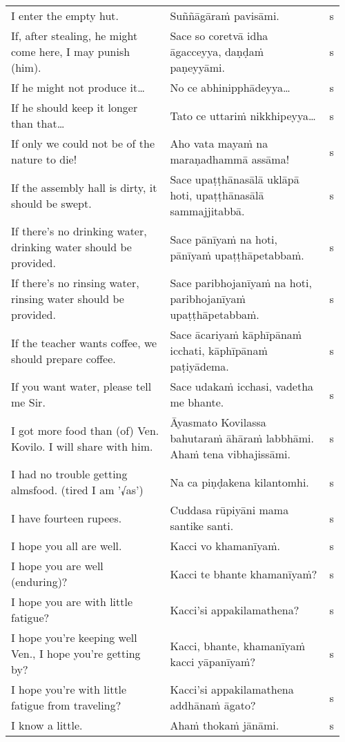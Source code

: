 \documentclass[a5paper]{memoir}
\begin{document}
\begin{longtable}{L{0.48\linewidth} L{0.48\linewidth} H}
I enter the empty hut. & Suññāgāraṁ pavisāmi. & s\\[0pt]
If, after stealing, he might come here, I may punish (him). & Sace so coretvā idha āgacceyya, daṇḍaṁ paṇeyyāmi. & s\\[0pt]
If he might not produce it\ldots{} & No ce abhinipphādeyya\ldots{} & s\\[0pt]
If he should keep it longer than that\ldots{} & Tato ce uttariṁ nikkhipeyya\ldots{} & s\\[0pt]
If only we could not be of the nature to die! & Aho vata mayaṁ na maraṇadhammā assāma! & s\\[0pt]
If the assembly hall is dirty, it should be swept. & Sace upaṭṭhānasālā uklāpā hoti, upaṭṭhānasālā sammajjitabbā. & s\\[0pt]
If there's no drinking water, drinking water should be provided. & Sace pānīyaṁ na hoti, pānīyaṁ upaṭṭhāpetabbaṁ. & s\\[0pt]
If there's no rinsing water, rinsing water should be provided. & Sace paribhojanīyaṁ na hoti, paribhojanīyaṁ upaṭṭhāpetabbaṁ. & s\\[0pt]
If the teacher wants coffee, we should prepare coffee. & Sace ācariyaṁ kāphīpānaṁ icchati, kāphīpānaṁ paṭiyādema. & s\\[0pt]
If you want water, please tell me Sir. & Sace udakaṁ icchasi, vadetha me bhante. & s\\[0pt]
I got more food than (of) Ven. Kovilo. I will share with him. & Āyasmato Kovilassa bahutaraṁ āhāraṁ labbhāmi. Ahaṁ tena vibhajissāmi. & s\\[0pt]
I had no trouble getting almsfood. (tired I am '√as') & Na ca piṇḍakena kilantomhi. & s\\[0pt]
I have fourteen rupees. & Cuddasa rūpiyāni mama santike santi. & s\\[0pt]
I hope you all are well. & Kacci vo khamanīyaṁ. & s\\[0pt]
I hope you are well (enduring)? & Kacci te bhante khamanīyaṁ? & s\\[0pt]
I hope you are with little fatigue? & Kacci'si appakilamathena? & s\\[0pt]
I hope you're keeping well Ven., I hope you're getting by? & Kacci, bhante, khamanīyaṁ kacci yāpanīyaṁ? & s\\[0pt]
I hope you're with little fatigue from traveling? & Kacci'si appakilamathena addhānaṁ āgato? & s\\[0pt]
I know a little. & Ahaṁ thokaṁ jānāmi. & s\\[0pt]

\end{longtable}
\end{document}
